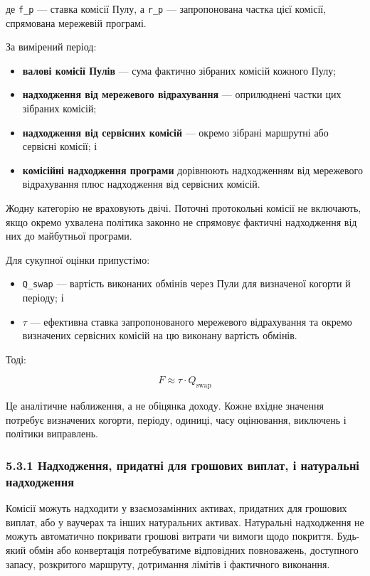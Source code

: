 \documentclass[11pt]{article}
\begin{document}
де \texttt{f\_p} --- ставка комісії Пулу, а \texttt{r\_p} --- запропонована частка цієї комісії, спрямована мережевій програмі.

За вимірений період:

\begin{itemize}[leftmargin=*]
\item \textbf{валові комісії Пулів} --- сума фактично зібраних комісій кожного Пулу;
\item \textbf{надходження від мережевого відрахування} --- оприлюднені частки цих зібраних комісій;
\item \textbf{надходження від сервісних комісій} --- окремо зібрані маршрутні або сервісні комісії; і
\item \textbf{комісійні надходження програми} дорівнюють надходженням від мережевого відрахування плюс надходження від сервісних комісій.
\end{itemize}
Жодну категорію не враховують двічі. Поточні протокольні комісії не включають, якщо окремо ухвалена політика законно не спрямовує фактичні надходження від них до майбутньої програми.

Для сукупної оцінки припустімо:

\begin{itemize}[leftmargin=*]
\item \texttt{Q\_swap} --- вартість виконаних обмінів через Пули для визначеної когорти й періоду; і
\item \texttt{$\tau$} --- ефективна ставка запропонованого мережевого відрахування та окремо визначених сервісних комісій на цю виконану вартість обмінів.
\end{itemize}
Тоді:

\[
F \approx \tau \cdot Q_{\mathrm{swap}}
\]

Це аналітичне наближення, а не обіцянка доходу. Кожне вхідне значення потребує визначених когорти, періоду, одиниці, часу оцінювання, виключень і політики виправлень.

\subsubsection*{5.3.1 Надходження, придатні для грошових виплат, і натуральні надходження}

Комісії можуть надходити у взаємозамінних активах, придатних для грошових виплат, або у ваучерах та інших натуральних активах. Натуральні надходження не можуть автоматично покривати грошові витрати чи вимоги щодо покриття. Будь-який обмін або конвертація потребуватиме відповідних повноважень, доступного запасу, розкритого маршруту, дотримання лімітів і фактичного виконання.
\end{document}
